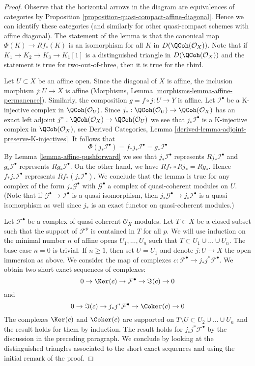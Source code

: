 \begin{proof}
Observe that the horizontal arrows in the diagram are
equivalences of categories by
Proposition \ref{proposition-quasi-compact-affine-diagonal}.
Hence we can identify these categories (and similarly for
other quasi-compact schemes with affine diagonal).
The statement of the lemma is that the canonical map
$\Phi(K) \to Rf_*(K)$ is an isomorphism for all $K$ in
$D(\QCoh(\mathcal{O}_X))$. Note that if $K_1 \to K_2 \to K_3 \to K_1[1]$
is a distinguished triangle in $D(\QCoh(\mathcal{O}_X))$ and
the statement is true for two-out-of-three, then it is true
for the third.

\medskip\noindent
Let $U \subset X$ be an affine open. Since the diagonal of $X$ is affine,
the inclusion morphism $j : U \to X$
is affine (Morphisms, Lemma \ref{morphisms-lemma-affine-permanence}).
Similarly, the composition $g = f \circ j : U \to Y$ is affine.
Let $\mathcal{I}^\bullet$ be a K-injective complex in $\QCoh(\mathcal{O}_U)$.
Since $j_* : \QCoh(\mathcal{O}_U) \to \QCoh(\mathcal{O}_X)$
has an exact left adjoint
$j^* : \QCoh(\mathcal{O}_X) \to \QCoh(\mathcal{O}_U)$
we see that $j_*\mathcal{I}^\bullet$ is a K-injective complex
in $\QCoh(\mathcal{O}_X)$, see
Derived Categories, Lemma \ref{derived-lemma-adjoint-preserve-K-injectives}.
It follows that
$$
\Phi(j_*\mathcal{I}^\bullet) =
f_*j_*\mathcal{I}^\bullet =
g_*\mathcal{I}^\bullet
$$
By Lemma \ref{lemma-affine-pushforward} we see that
$j_*\mathcal{I}^\bullet$ represents $Rj_*\mathcal{I}^\bullet$ and
$g_*\mathcal{I}^\bullet$ represents $Rg_*\mathcal{I}^\bullet$.
On the other hand, we have $Rf_* \circ Rj_* = Rg_*$.
Hence $f_*j_*\mathcal{I}^\bullet$ represents $Rf_*(j_*\mathcal{I}^\bullet)$.
We conclude that the lemma is true for any complex
of the form $j_*\mathcal{G}^\bullet$ with $\mathcal{G}^\bullet$
a complex of quasi-coherent modules on $U$. (Note that if
$\mathcal{G}^\bullet \to \mathcal{I}^\bullet$ is a quasi-isomorphism,
then $j_*\mathcal{G}^\bullet \to j_*\mathcal{I}^\bullet$ is a
quasi-isomorphism as well since $j_*$ is an exact functor
on quasi-coherent modules.)

\medskip\noindent
Let $\mathcal{F}^\bullet$ be a complex of quasi-coherent
$\mathcal{O}_X$-modules. Let $T \subset X$ be a closed subset
such that the support of $\mathcal{F}^p$ is contained in $T$
for all $p$. We will use induction on the minimal number $n$
of affine opens $U_1, \ldots, U_n$ such that
$T \subset U_1 \cup \ldots \cup U_n$. The base case $n = 0$ is trivial.
If $n \geq 1$, then set $U = U_1$ and denote $j : U \to X$ the
open immersion as above. We consider the map of complexes
$c : \mathcal{F}^\bullet \to j_*j^*\mathcal{F}^\bullet$.
We obtain two short exact sequences of complexes:
$$
0 \to \Ker(c) \to \mathcal{F}^\bullet \to \Im(c) \to 0
$$
and
$$
0 \to \Im(c) \to j_*j^*\mathcal{F}^\bullet \to \Coker(c) \to 0
$$
The complexes $\Ker(c)$ and $\Coker(c)$ are supported
on $T \setminus U \subset U_2 \cup \ldots \cup U_n$ and the result
holds for them by induction. The result holds for
$j_*j^*\mathcal{F}^\bullet$ by the discussion in the preceding
paragraph. We conclude by looking at the distinguished triangles
associated to the short exact sequences and using the initial
remark of the proof.
\end{proof}

